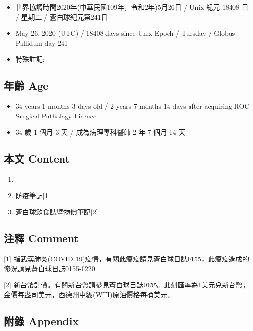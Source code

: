\documentclass[
]{article}
\providecommand{\tightlist}{%
  \setlength{\itemsep}{0pt}\setlength{\parskip}{0pt}}
\begin{document}
\begin{itemize}
\tightlist
\item
  世界協調時間2020年(中華民國109年，令和2年)5月26日 / Unix 紀元 18408 日
  / 星期二 / 蒼白球紀元第241日
\item
  May 26, 2020 (UTC) / 18408 days since Unix Epoch / Tuesday / Globus
  Pallidum day 241
\item
  特殊註記:
\end{itemize}

\hypertarget{ux5e74ux9f61-age-25}{%
\subsection{年齡 Age}\label{ux5e74ux9f61-age-25}}

\begin{itemize}
\tightlist
\item
  34 years 1 months 3 days old / 2 years 7 months 14 days after
  acquiring ROC Surgical Pathology Licence
\item
  34 歲 1 個月 3 天 / 成為病理專科醫師 2 年 7 個月 14 天
\end{itemize}

\hypertarget{ux672cux6587-content-25}{%
\subsection{本文 Content}\label{ux672cux6587-content-25}}

\begin{enumerate}
\def\labelenumi{\arabic{enumi}.}
\item
\item
  防疫筆記{[}1{]}
\item
  蒼白球飲食誌暨物價筆記{[}2{]}
\end{enumerate}

\hypertarget{ux6ce8ux91cb-comment-25}{%
\subsection{注釋 Comment}\label{ux6ce8ux91cb-comment-25}}

{[}1{]}
指武漢肺炎(COVID-19)疫情，有關此瘟疫請見蒼白球日誌0155，此瘟疫造成的慘況請見蒼白球日誌0155-0220

{[}2{]}
新台幣計價。有關新台幣請參見蒼白球日誌0155。此刻匯率為1美元兌新台幣，金價每盎司美元，西德州中級(WTI)原油價格每桶美元。

\hypertarget{ux9644ux9304-appendix-25}{%
\subsection{附錄 Appendix}\label{ux9644ux9304-appendix-25}}
\end{document}
